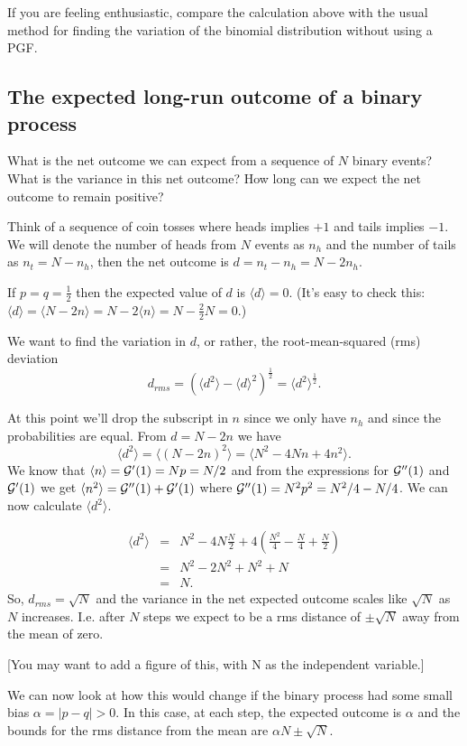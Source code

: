 If you are feeling enthusiastic, compare the calculation above with the usual method for finding the variation of the binomial distribution without using a PGF.

\subsection{The expected long-run outcome of a binary process}
What is the net outcome we can expect from a sequence of $N$ binary events? What is the variance in this net outcome? How long can we expect the net outcome to remain positive? 

Think of a sequence of coin tosses where heads implies $+1$ and tails implies $-1$. We will denote the number of heads from $N$ events as $n_h$ and the number of tails as $n_t = N-n_h$, then the net outcome is $d = n_t-n_h = N-2n_h$. 

If $p=q=\frac12$ then the expected value of $d$ is $\langle d\rangle= 0$. (It's easy to check this: $\langle d\rangle = \langle N-2n\rangle = N-2\langle n\rangle = N-\frac{2}{2}N=0.$)

We want to find the variation in $d$, or rather, the root-mean-squared (rms) deviation 
$$d_{rms} = \left(\langle d^2\rangle - \langle d\rangle^2\right)^{\frac12} =  \langle d^2\rangle^{\frac12}.$$

At this point we'll drop the subscript in $n$ since we only have $n_h$ and since the probabilities are equal. From $d=N-2n$ we have $$ \langle d^2\rangle = \langle (N-2n)^2\rangle = \langle N^2 -4Nn+4n^2\rangle.$$
We know that $\langle n\rangle = \mathcal{G}'(1)=Np=N/2$ and from the expressions for $\mathcal{G}''(1)$ and $\mathcal{G}'(1)$ we get $\langle n^2 \rangle = \mathcal{G}''(1) + \mathcal{G}'(1)$ where $\mathcal{G}''(1) = N^2p^2 = N^2/4-N/4$. We can now calculate $\langle d^2 \rangle$.

\begin{eqnarray*}
	\langle d^2 \rangle &=& N^2 -4N\frac{N}{2}+4\left(\frac{N^2}{4}-\frac{N}{4}+\frac{N}{2}\right)\\
		&=& N^2-2N^2+N^2+N\\
		&=& N.
\end{eqnarray*}
So, $d_{rms}=\sqrt{N}$ and the variance in the net expected outcome scales like $\sqrt{N}$ as $N$ increases. I.e. after $N$ steps we expect to be a rms distance of $\pm \sqrt{N}$ away from the mean of zero.

[You may want to add a figure of this, with N as the independent variable.]

We can now look at how this would change if the binary process had some small bias $\alpha = |p-q| >0$. In this case, at each step, the expected outcome is $\alpha$ and the bounds for the rms distance from the mean are $\alpha N\pm\sqrt{N}$. 

